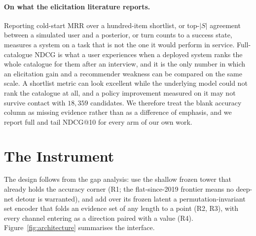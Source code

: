 \documentclass[manuscript,screen]{acmart}
\begin{document}
\paragraph{On what the elicitation literature reports.} Reporting cold-start MRR over a hundred-item shortlist, or top-$|S|$ agreement between a simulated user and a posterior, or turn counts to a success state, measures a system on a task that is not the one it would perform in service. Full-catalogue NDCG is what a user experiences when a deployed system ranks the whole catalogue for them after an interview, and it is the only number in which an elicitation gain and a recommender weakness can be compared on the same scale. A shortlist metric can look excellent while the underlying model could not rank the catalogue at all, and a policy improvement measured on it may not survive contact with $18{,}359$ candidates. We therefore treat the blank accuracy column as missing evidence rather than as a difference of emphasis, and we report full and tail NDCG@10 for every arm of our own work.

\section{The Instrument}\label{sec:method}

The design follows from the gap analysis: use the shallow frozen tower that already holds the accuracy corner (R1; the flat-since-2019 frontier means no deep-net detour is warranted), and add over its frozen latent a permutation-invariant set encoder that folds an evidence set of any length to a point (R2, R3), with every channel entering as a direction paired with a value (R4). Figure~\ref{fig:architecture} summarises the interface.
\end{document}

